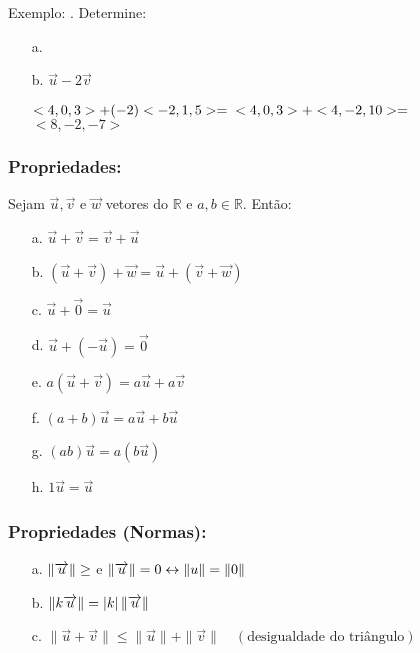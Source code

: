 \date{08-10-2024}

Exemplo: .
Determine: \\
\begin{itemize}
    \item[a.] \mathexpr{}
    \item[b. ] $\overrightarrow{u} - 2 \overrightarrow{v}$
    
    $< 4,0,3> + (-2) <-2,1,5> = \\ < 4,0,3> + <4,-2,10> =$ \\ $<8,-2,-7>$ 
\end{itemize}

\subsubsection{Propriedades:}

Sejam $\overrightarrow{u}, \overrightarrow{v}$ e $\overrightarrow{w}$ vetores do $\mathbb{R}$ e $a,b \in \mathbb{R}$.
Então: \\
\begin{itemize}
    \item[a.] $\overrightarrow{u} + \overrightarrow{v} = \overrightarrow{v} + \overrightarrow{u}$
    \item[b.] $(\overrightarrow{u}+ \overrightarrow{v}) + \overrightarrow{w} = \overrightarrow{u} + (\overrightarrow{v} + \overrightarrow{w})$  
    \item[c.] $\overrightarrow{u} + \overrightarrow{0} = \overrightarrow{u}$ 
    \item[d.] $\overrightarrow{u} + (-\overrightarrow{u}) = \overrightarrow{0}$ 
    \item[e.] $a (\overrightarrow{u} + \overrightarrow{v}) = a \overrightarrow{u} + a \overrightarrow{v}$
    \item[f.] $(a+b) \overrightarrow{u} = a \overrightarrow{u} + b \overrightarrow{u}$ 
    \item[g.] $(ab) \overrightarrow{u} = a (b \overrightarrow{u})$
    \item[h.] $1 \overrightarrow{u} = \overrightarrow{u}$ 
\end{itemize}

\subsubsection{Propriedades (Normas):}
\begin{itemize}
    \item[a.] $\left\lVert \overrightarrow{u} \right\rVert \geq$ e $\left\lVert \overrightarrow{u} \right\rVert = 0 \leftrightarrow \left\lVert u \right\rVert = \left\lVert 0 \right\rVert$
    \item[b.] $\left\lVert k \overrightarrow{u} \right\rVert = |k| \left\lVert \overrightarrow{u} \right\rVert$ 
    \item[c.] $ \|\vec{u} + \vec{v}\| \leq \|\vec{u}\| + \|\vec{v}\| \quad (\text{desigualdade do triângulo})$ 
\end{itemize}

